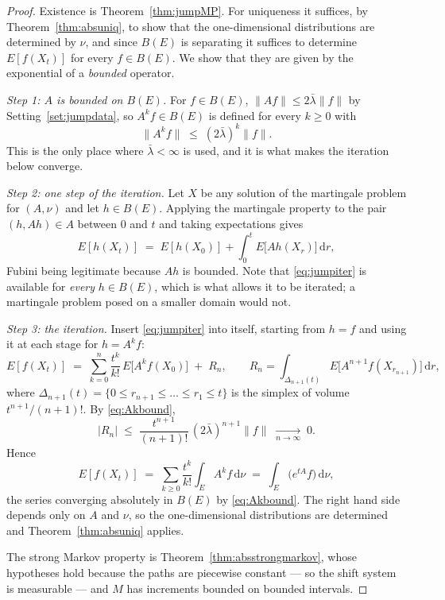 \documentclass[11pt,a4paper]{article}
\theoremstyle{plain}
\theoremstyle{definition}
\theoremstyle{remark}
\newcommand{\Bdd}{B}                           %
\newcommand{\dif}{\,\mathrm{d}}
\begin{document}
\begin{proof}
  Existence is Theorem~\ref{thm:jumpMP}.  For uniqueness it suffices, by
  Theorem~\ref{thm:absuniq}, to show that the one-dimensional distributions are
  determined by $\nu$, and since $\Bdd(E)$ is separating it suffices to determine
  $E[f(X_t)]$ for every $f \in \Bdd(E)$.  We show that they are given by the
  exponential of a \emph{bounded} operator.

  \emph{Step 1: $A$ is bounded on $\Bdd(E)$.}  For $f \in \Bdd(E)$,
  $\lVert Af \rVert \leq 2\bar\lambda \lVert f \rVert$ by Setting~\ref{set:jumpdata},
  so $A^k f \in \Bdd(E)$ is defined for every $k \geq 0$ with
  \begin{equation}
    \label{eq:Akbound}
    \lVert A^k f \rVert \;\leq\; (2\bar\lambda)^k \lVert f \rVert .
  \end{equation}
  This is the only place where $\bar\lambda < \infty$ is used, and it is what
  makes the iteration below converge.

  \emph{Step 2: one step of the iteration.}  Let $X$ be any solution of the
  martingale problem for $(A,\nu)$ and let $h \in \Bdd(E)$.  Applying the
  martingale property to the pair $(h,Ah) \in A$ between $0$ and $t$ and taking
  expectations gives
  \begin{equation}
    \label{eq:jumpiter}
    E[h(X_t)] \;=\; E[h(X_0)] + \int_0^t E\bigl[ Ah(X_r) \bigr] \dif r ,
  \end{equation}
  Fubini being legitimate because $Ah$ is bounded.  Note that
  \eqref{eq:jumpiter} is available for \emph{every} $h \in \Bdd(E)$, which is what
  allows it to be iterated; a martingale problem posed on a smaller domain would
  not.

  \emph{Step 3: the iteration.}  Insert \eqref{eq:jumpiter} into itself, starting
  from $h = f$ and using it at each stage for $h = A^k f$:
  \[
    E[f(X_t)] \;=\; \sum_{k=0}^{n} \frac{t^k}{k!} \, E\bigl[ A^k f(X_0) \bigr]
      \;+\; R_n , \qquad
    R_n = \int_{\Delta_{n+1}(t)} E\bigl[ A^{n+1}f(X_{r_{n+1}}) \bigr] \dif r ,
  \]
  where $\Delta_{n+1}(t) = \{0 \leq r_{n+1} \leq \dots \leq r_1 \leq t\}$ is the
  simplex of volume $t^{n+1}/(n+1)!$.  By \eqref{eq:Akbound},
  \[
    |R_n| \;\leq\; \frac{t^{n+1}}{(n+1)!} \, (2\bar\lambda)^{n+1} \lVert f\rVert
      \;\xrightarrow[n\to\infty]{}\; 0 .
  \]
  Hence
  \begin{equation}
    \label{eq:jumpexp}
    E[f(X_t)] \;=\; \sum_{k \geq 0} \frac{t^k}{k!} \int_E A^k f \dif\nu
      \;=\; \int_E \bigl( e^{tA} f \bigr) \dif\nu ,
  \end{equation}
  the series converging absolutely in $\Bdd(E)$ by \eqref{eq:Akbound}.  The right
  hand side depends only on $A$ and $\nu$, so the one-dimensional distributions
  are determined and Theorem~\ref{thm:absuniq} applies.

  The strong Markov property is Theorem~\ref{thm:absstrongmarkov}, whose
  hypotheses hold because the paths are piecewise constant --- so the shift system
  is measurable --- and $M$ has increments bounded on bounded intervals.
\end{proof}
\end{document}
